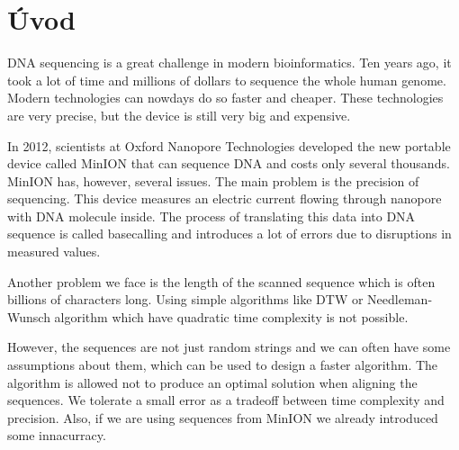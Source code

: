 \chapter*{Úvod} %

DNA sequencing is a great challenge in modern bioinformatics. Ten years ago, it took a lot of time
and millions of dollars to sequence the whole human genome. Modern technologies can nowdays do so
faster and cheaper. These technologies are very precise, but the device is still very big and
expensive. \cite{barbora_bakalarka}

In 2012, scientists at Oxford Nanopore Technologies developed the new portable device
called MinION that can sequence DNA and costs only several thousands. MinION has, however, several
issues. The main problem is the precision of sequencing. This device measures an electric current
flowing through nanopore with DNA molecule inside. The process of translating this data into DNA
sequence is called basecalling and introduces a lot of errors due to disruptions in measured values.

Another problem we face is the length of the scanned sequence which is often billions of characters
long. Using simple algorithms like DTW or Needleman-Wunsch algorithm which have quadratic time
complexity is not possible.

However, the sequences are not just random strings and we can often have some assumptions about
them, which can be used to design a faster algorithm. The algorithm is allowed not to produce an
optimal solution when aligning the sequences. We tolerate a small error as a tradeoff between time
complexity and precision. Also, if we are using sequences from MinION we already introduced some
innacurracy.
